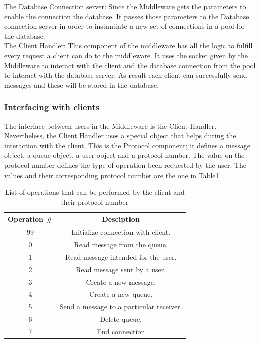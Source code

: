 The Database Connection server:
Since the Middleware gets the parameters to enable the connection the database. It passes those parameters to the Database connection server in order to instantiate a new set of connections in a pool for the database.\\

The Client Handler:
This component of the middleware has all the logic to fulfill every request a client can do to the middleware. It uses the socket given by the Middleware to interact with the client and the database connection from the pool to interact with the database server. As result each client can successfully send messages and these will be stored in the database.


\subsubsection{Interfacing with clients}\label{sec:interfacing-with-clients}
The interface between users in the Middleware is the Client Handler. Nevertheless, the Client Handler uses a special object that helps during the interaction with the client. This is the Protocol component; it defines a message object, a queue object, a user object and a protocol number. The value on the protocol number defines the type of operation been requested by the user. The values and their corresponding protocol number are the one in Table\ref{opera}.\\

\begin{table}[h]\centering

\begin{tabular}
{|c|c|}
\hline  \textbf{Operation \#} & \textbf{Desciption} \\ 
\hline  99 & Initialize connection with client. \\ 
\hline  0 &  Read message from the queue.\\ 
\hline  1 &  Read message intended for the user.\\ 
\hline  2 &  Read message sent by a user.\\ 
\hline  3 &  Create a new message.\\ 
\hline  4 &  Create a new queue.\\ 
\hline  5 &  Send a message to a particular receiver.\\ 
\hline  6 &  Delete queue.\\ 
\hline  7 &  End connection \\ 
\hline 
\end{tabular} 
\caption{List of operations that can be performed by the client and their protocol number}
\label{opera}
\end{table}


